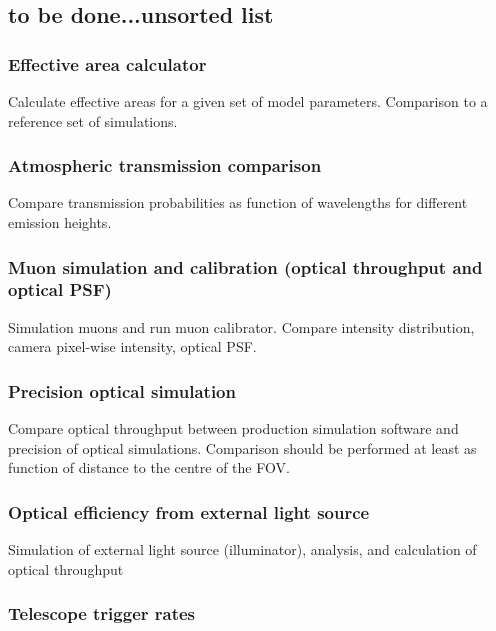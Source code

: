 \subsection{to be done...unsorted list}

\subsubsection{Effective area calculator}

Calculate effective areas for a given set of model parameters. Comparison to a reference set of simulations.

\subsubsection{Atmospheric transmission comparison}

Compare transmission probabilities as function of wavelengths for different emission heights.

\subsubsection{Muon simulation and calibration (optical throughput and optical PSF)}

Simulation muons and run muon calibrator. Compare intensity distribution, camera pixel-wise intensity, optical PSF.

\subsubsection{Precision optical simulation}

Compare optical throughput between production simulation software and precision of optical simulations.
Comparison should be performed at least as function of distance to the centre of the FOV.


\subsubsection{Optical efficiency from external light source}

Simulation of external light source (illuminator), analysis, and calculation of optical throughput


\subsubsection{Telescope trigger rates}

